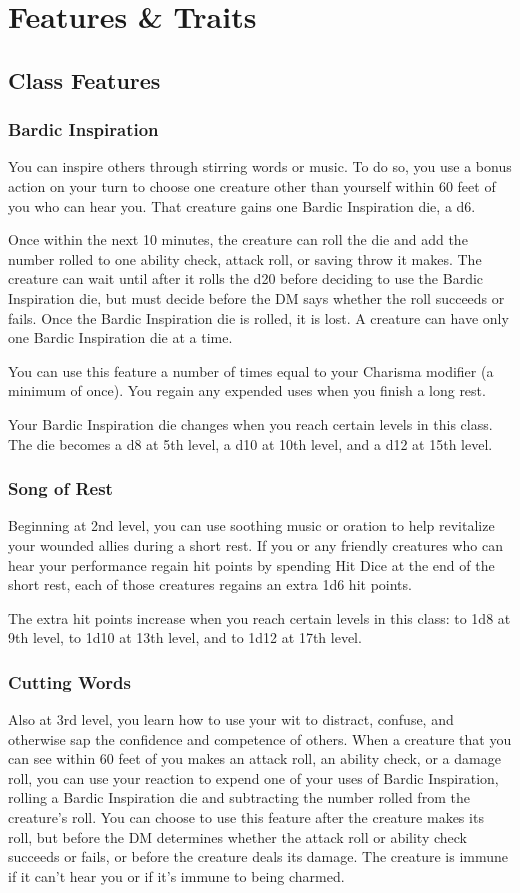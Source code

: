 \documentclass[11pt]{article}
\begin{document}
\section{Features \& Traits}
\label{sec:org90acd03}
\subsection{Class Features}
\label{sec:org10a2f50}
\subsubsection{Bardic Inspiration}
\label{sec:org1d53d13}
You can inspire others through stirring words or music. To do so, you use a bonus action on your turn to choose one creature other than yourself within 60 feet of you who can hear you. That creature gains one Bardic Inspiration die, a d6.

Once within the next 10 minutes, the creature can roll the die and add the number rolled to one ability check, attack roll, or saving throw it makes. The creature can wait until after it rolls the d20 before deciding to use the Bardic Inspiration die, but must decide before the DM says whether the roll succeeds or fails. Once the Bardic Inspiration die is rolled, it is lost. A creature can have only one Bardic Inspiration die at a time.

You can use this feature a number of times equal to your Charisma modifier (a minimum of once). You regain any expended uses when you finish a long rest.

Your Bardic Inspiration die changes when you reach certain levels in this class. The die becomes a d8 at 5th level, a d10 at 10th level, and a d12 at 15th level.
\subsubsection{Song of Rest}
\label{sec:orge6c33a2}
Beginning at 2nd level, you can use soothing music or oration to help revitalize your wounded allies during a short rest. If you or any friendly creatures who can hear your performance regain hit points by spending Hit Dice at the end of the short rest, each of those creatures regains an extra 1d6 hit points.

The extra hit points increase when you reach certain levels in this class: to 1d8 at 9th level, to 1d10 at 13th level, and to 1d12 at 17th level.
\subsubsection{Cutting Words}
\label{sec:orgc04a5f2}
Also at 3rd level, you learn how to use your wit to distract, confuse, and otherwise sap the confidence and competence of others. When a creature that you can see within 60 feet of you makes an attack roll, an ability check, or a damage roll, you can use your reaction to expend one of your uses of Bardic Inspiration, rolling a Bardic Inspiration die and subtracting the number rolled from the creature's roll. You can choose to use this feature after the creature makes its roll, but before the DM determines whether the attack roll or ability check succeeds or fails, or before the creature deals its damage. The creature is immune if it can't hear you or if it's immune to being charmed.
\end{document}

